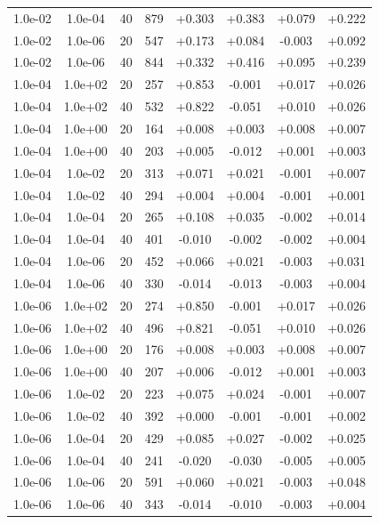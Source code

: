 \documentclass[11pt,a4paper]{article}
\begin{document}
\begin{table}
\begin{tabular}{*{8}c}
 1.0e-02 	 & 1.0e-04 	 & 40 & 879 	 & +0.303 & +0.383 & +0.079 & +0.222 \\ 
 1.0e-02 	 & 1.0e-06 	 & 20 & 547 	 & +0.173 & +0.084 & -0.003 & +0.092 \\
 1.0e-02 	 & 1.0e-06 	 & 40 & 844 	 & +0.332 & +0.416 & +0.095 & +0.239 \\ 
 \hline 
 1.0e-04 	 & 1.0e+02 	 & 20 & 257 	 & +0.853 & -0.001 & +0.017 & +0.026 \\ 
 1.0e-04 	 & 1.0e+02 	 & 40 & 532 	 & +0.822 & -0.051 & +0.010 & +0.026 \\ 
 1.0e-04 	 & 1.0e+00 	 & 20 & 164 	 & +0.008 & +0.003 & +0.008 & +0.007 \\ 
 1.0e-04 	 & 1.0e+00 	 & 40 & 203 	 & +0.005 & -0.012 & +0.001 & +0.003 \\  
 1.0e-04 	 & 1.0e-02 	 & 20 & 313 	 & +0.071 & +0.021 & -0.001 & +0.007 \\ 
 1.0e-04 	 & 1.0e-02 	 & 40 & 294 	 & +0.004 & +0.004 & -0.001 & +0.001 \\ 
 1.0e-04 	 & 1.0e-04 	 & 20 & 265 	 & +0.108 & +0.035 & -0.002 & +0.014 \\
 1.0e-04 	 & 1.0e-04 	 & 40 & 401 	 & -0.010 & -0.002 & -0.002 & +0.004 \\ 
 1.0e-04 	 & 1.0e-06 	 & 20 & 452 	 & +0.066 & +0.021 & -0.003 & +0.031 \\ 
 1.0e-04 	 & 1.0e-06 	 & 40 & 330 	 & -0.014 & -0.013 & -0.003 & +0.004 \\ 
 \hline
 1.0e-06 	 & 1.0e+02 	 & 20 & 274 	 & +0.850 & -0.001 & +0.017 & +0.026 \\ 
 1.0e-06 	 & 1.0e+02 	 & 40 & 496 	 & +0.821 & -0.051 & +0.010 & +0.026 \\
 1.0e-06 	 & 1.0e+00 	 & 20 & 176 	 & +0.008 & +0.003 & +0.008 & +0.007 \\ 
 1.0e-06 	 & 1.0e+00 	 & 40 & 207 	 & +0.006 & -0.012 & +0.001 & +0.003 \\ 
 1.0e-06 	 & 1.0e-02 	 & 20 & 223 	 & +0.075 & +0.024 & -0.001 & +0.007 \\ 
 1.0e-06 	 & 1.0e-02 	 & 40 & 392 	 & +0.000 & -0.001 & -0.001 & +0.002 \\ 
 1.0e-06 	 & 1.0e-04 	 & 20 & 429 	 & +0.085 & +0.027 & -0.002 & +0.025 \\ 
 1.0e-06 	 & 1.0e-04 	 & 40 & 241 	 & -0.020 & -0.030 & -0.005 & +0.005 \\ 
 1.0e-06 	 & 1.0e-06 	 & 20 & 591 	 & +0.060 & +0.021 & -0.003 & +0.048 \\ 
 1.0e-06 	 & 1.0e-06 	 & 40 & 343 	 & -0.014 & -0.010 & -0.003 & +0.004 \\ 

\end{tabular}
\label{TAB::timesteps}
\end{table} 
\end{document}
